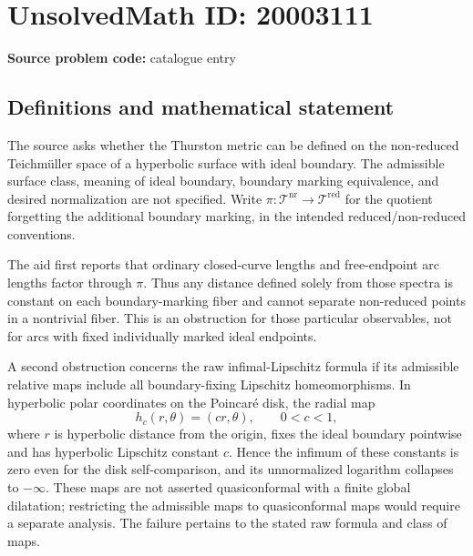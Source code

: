 \documentclass[11pt]{article}
\begin{document}
\section*{UnsolvedMath ID: 20003111}
\textbf{Source problem code:} catalogue entry
\subsection{Definitions and mathematical statement}
The source asks whether the Thurston metric can be defined on the non-reduced Teichm\"uller space of a hyperbolic surface with ideal boundary. The admissible surface class, meaning of ideal boundary, boundary marking equivalence, and desired normalization are not specified. Write \(\pi:\mathcal T^{\mathrm{nr}}\to\mathcal T^{\mathrm{red}}\) for the quotient forgetting the additional boundary marking, in the intended reduced/non-reduced conventions.

The aid first reports that ordinary closed-curve lengths and free-endpoint arc lengths factor through \(\pi\). Thus any distance defined solely from those spectra is constant on each boundary-marking fiber and cannot separate non-reduced points in a nontrivial fiber. This is an obstruction for those particular observables, not for arcs with fixed individually marked ideal endpoints.

A second obstruction concerns the raw infimal-Lipschitz formula if its admissible relative maps include all boundary-fixing Lipschitz homeomorphisms. In hyperbolic polar coordinates on the Poincar\'e disk, the radial map
\[
 h_c(r,\theta)=(cr,\theta),\qquad0<c<1,
\]
where \(r\) is hyperbolic distance from the origin, fixes the ideal boundary pointwise and has hyperbolic Lipschitz constant \(c\). Hence the infimum of these constants is zero even for the disk self-comparison, and its unnormalized logarithm collapses to \(-\infty\). These maps are not asserted quasiconformal with a finite global dilatation; restricting the admissible maps to quasiconformal maps would require a separate analysis. The failure pertains to the stated raw formula and class of maps.
\end{document}
